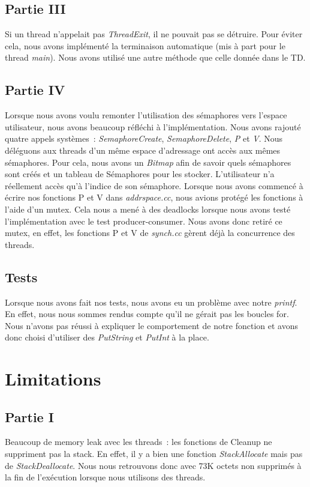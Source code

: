 \documentclass{article}
\begin{document}
\subsection{Partie III}
Si un thread n'appelait pas \textit{ThreadExit}, il ne pouvait pas se détruire. Pour éviter cela, nous avons implémenté la terminaison 
automatique (mis à part pour le thread \textit{main}). Nous avons utilisé une autre méthode que celle donnée dans le TD.


\subsection{Partie IV}
Lorsque nous avons voulu remonter l'utilisation des sémaphores vers l'espace
utilisateur, nous avons beaucoup réfléchi à l'implémentation. Nous avons
rajouté quatre appels systèmes : \textit{SemaphoreCreate},
\textit{SemaphoreDelete}, \textit{P} et \textit{V}. Nous déléguons aux threads
d'un même espace d'adressage ont accès aux mêmes sémaphores. Pour cela, nous
avons un \textit{Bitmap} afin de savoir quels sémaphores sont créés et un
tableau de Sémaphores pour les stocker. L'utilisateur n'a réellement accès qu'à
l'indice de son sémaphore. Lorsque nous avons commencé à écrire nos fonctions P
et V dans \textit{addrspace.cc}, nous avions protégé les fonctions à l'aide
d'un mutex. Cela nous a mené à des deadlocks lorsque nous avons testé
l'implémentation avec le test producer-consumer. Nous avons donc retiré ce
mutex, en effet, les fonctions P et V de \textit{synch.cc} gèrent déjà la
concurrence des threads.

\subsection{Tests}
Lorsque nous avons fait nos tests, nous avons eu un problème avec notre
\textit{printf}. En effet, nous nous sommes rendus compte qu'il ne gérait pas
les boucles for. Nous n'avons pas réussi à expliquer le comportement de notre
fonction et avons donc choisi d'utiliser des \textit{PutString} et
\textit{PutInt} à la place.

\section{Limitations}
\subsection{Partie I}
Beaucoup de memory leak avec les threads : les fonctions de Cleanup ne
suppriment pas la stack. En effet, il y a bien une fonction
\textit{StackAllocate} mais pas de \textit{StackDeallocate}. Nous nous
retrouvons donc avec 73K octets non supprimés à la fin de l'exécution lorsque
nous utilisons des threads.
\end{document}
